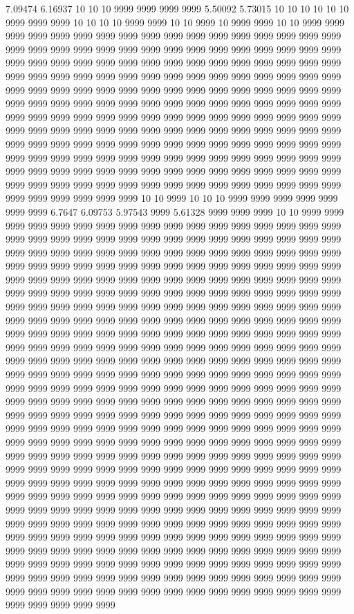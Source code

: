 7.09474 6.16937 10 10 10 9999 9999 9999 9999 5.50092 5.73015 10 10 10 10 10 10 9999 9999 9999 10 10 10 10 9999 9999 10 10 9999 10 9999 9999 10 10 9999 9999 9999 9999 9999 9999 9999 9999 9999 9999 9999 9999 9999 9999 9999 9999 9999 9999 9999 9999 9999 9999 9999 9999 9999 9999 9999 9999 9999 9999 9999 9999 9999 9999 9999 9999 9999 9999 9999 9999 9999 9999 9999 9999 9999 9999 9999 9999 9999 9999 9999 9999 9999 9999 9999 9999 9999 9999 9999 9999 9999 9999 9999 9999 9999 9999 9999 9999 9999 9999 9999 9999 9999 9999 9999 9999 9999 9999 9999 9999 9999 9999 9999 9999 9999 9999 9999 9999 9999 9999 9999 9999 9999 9999 9999 9999 9999 9999 9999 9999 9999 9999 9999 9999 9999 9999 9999 9999 9999 9999 9999 9999 9999 9999 9999 9999 9999 9999 9999 9999 9999 9999 9999 9999 9999 9999 9999 9999 9999 9999 9999 9999 9999 9999 9999 9999 9999 9999 9999 9999 9999 9999 9999 9999 9999 9999 9999 9999 9999 9999 9999 9999 9999 9999 9999 9999 9999 9999 9999 9999 9999 9999 9999 9999 9999 9999 9999 9999 9999 9999 9999 9999 9999 9999 9999 9999 9999 9999 9999 9999 9999 9999 9999 9999 9999 9999 9999 9999 10 10 9999 10 10 10 9999 9999 9999 9999 9999 9999 9999 6.7647 6.09753 5.97543 9999 5.61328 9999 9999 9999 10 10 9999 9999 9999 9999 9999 9999 9999 9999 9999 9999 9999 9999 9999 9999 9999 9999 9999 9999 9999 9999 9999 9999 9999 9999 9999 9999 9999 9999 9999 9999 9999 9999 9999 9999 9999 9999 9999 9999 9999 9999 9999 9999 9999 9999 9999 9999 9999 9999 9999 9999 9999 9999 9999 9999 9999 9999 9999 9999 9999 9999 9999 9999 9999 9999 9999 9999 9999 9999 9999 9999 9999 9999 9999 9999 9999 9999 9999 9999 9999 9999 9999 9999 9999 9999 9999 9999 9999 9999 9999 9999 9999 9999 9999 9999 9999 9999 9999 9999 9999 9999 9999 9999 9999 9999 9999 9999 9999 9999 9999 9999 9999 9999 9999 9999 9999 9999 9999 9999 9999 9999 9999 9999 9999 9999 9999 9999 9999 9999 9999 9999 9999 9999 9999 9999 9999 9999 9999 9999 9999 9999 9999 9999 9999 9999 9999 9999 9999 9999 9999 9999 9999 9999 9999 9999 9999 9999 9999 9999 9999 9999 9999 9999 9999 9999 9999 9999 9999 9999 9999 9999 9999 9999 9999 9999 9999 9999 9999 9999 9999 9999 9999 9999 9999 9999 9999 9999 9999 9999 9999 9999 9999 9999 9999 9999 9999 9999 9999 9999 9999 9999 9999 9999 9999 9999 9999 9999 9999 9999 9999 9999 9999 9999 9999 9999 9999 9999 9999 9999 9999 9999 9999 9999 9999 9999 9999 9999 9999 9999 9999 9999 9999 9999 9999 9999 9999 9999 9999 9999 9999 9999 9999 9999 9999 9999 9999 9999 9999 9999 9999 9999 9999 9999 9999 9999 9999 9999 9999 9999 9999 9999 9999 9999 9999 9999 9999 9999 9999 9999 9999 9999 9999 9999 9999 9999 9999 9999 9999 9999 9999 9999 9999 9999 9999 9999 9999 9999 9999 9999 9999 9999 9999 9999 9999 9999 9999 9999 9999 9999 9999 9999 9999 9999 9999 9999 9999 9999 9999 9999 9999 9999 9999 9999 9999 9999 9999 9999 9999 9999 9999 9999 9999 9999 9999 9999 9999 9999 9999 9999 9999 9999 9999 9999 9999 9999 9999 9999 9999 9999 9999 9999 9999 9999 9999 9999 9999 9999 9999 9999 9999 9999 9999 9999 9999 9999 9999 9999 9999 9999 9999 9999 9999 9999 9999 9999 9999 9999 9999 9999 9999 9999 9999 9999 9999 9999 9999 9999 9999 9999 9999 9999 9999 9999 9999 9999 9999 9999 9999 9999 9999 9999 9999 9999 9999 9999 9999 9999 9999 9999 9999 9999 9999 9999 9999 9999 9999 9999 9999 9999 9999 9999 9999 9999 9999 9999 9999 9999 9999 9999 9999 9999 9999 9999 9999 9999 9999 9999 9999 